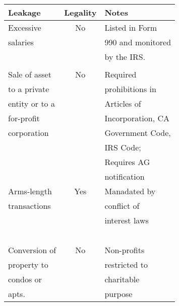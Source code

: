 \documentclass[11pt]{memoir}
\author{Vladimir G. Ivanović}
\date{\today}
\title{}
\begin{document}
\begin{center}
  \begin{table}[hbtp]
    \begin{tabular}{|l|c|l|}
      \toprule
      Leakage & Legality & Notes \\
      \midrule
      Excessive & No & Listed in Form \\
      salaries & & 990 and monitored \\
              & & by the IRS. \\
              & & \\
      \hline
      Sale of asset & No & Required \\
      to a private & & prohibitions in \\
      entity or to a & & Articles of \\
      for-profit & & Incorporation, CA \\
      corporation & & Government Code, \\
              & & IRS Code; \\
              & & Requires AG \\
              & & notification \\
      \hline
      Arms-length & Yes & Manadated by \\
      transactions & & conflict of \\
              & & interest laws \\
              & & \\
      \hline
              & & \\
              & & \\
              & & \\
              & & \\
      Conversion of & No & Non-profits \\
      property to & & restricted to \\
      condos or & & charitable \\
      apts. & & purpose \\
      \bottomrule
    \end{tabular}
  \end{table}
\end{center}
\end{document}
